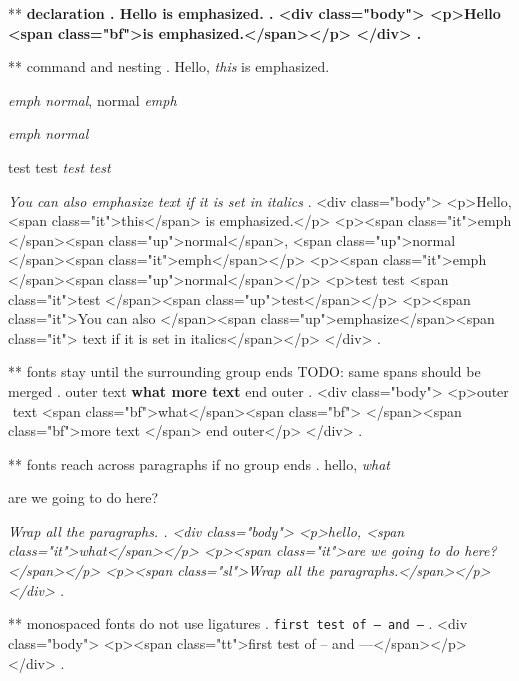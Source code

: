 ** \bfseries declaration
.
Hello \bfseries is emphasized.
.
<div class="body">
<p>Hello <span class="bf">is emphasized.</span></p>
</div>
.

** \emph{} command and nesting
.
Hello, \emph{this} is emphasized.

\emph{emph \textup{normal}}, \textup{normal \emph{emph}}

\emph{emph \emph{normal}}

test {test \em\em\em test \em test}

\textit{You can also \emph{emphasize} text if it is set in italics}
.
<div class="body">
<p>Hello, <span class="it">this</span> is emphasized.</p>
<p><span class="it">emph </span><span class="up">normal</span>, <span class="up">normal </span><span class="it">emph</span></p>
<p><span class="it">emph </span><span class="up">normal</span></p>
<p>test test <span class="it">test </span><span class="up">test</span></p>
<p><span class="it">You can also </span><span class="up">emphasize</span><span class="it"> text if it is set in italics</span></p>
</div>
.


** fonts stay until the surrounding group ends      TODO: same spans should be merged
.
outer { text \bfseries {what} more text } end outer
.
<div class="body">
<p>outer ​ text <span class="bf">what</span><span class="bf">​ </span><span class="bf">more text </span>​ end outer</p>
</div>
.


** fonts reach across paragraphs if no group ends
.
hello, \itshape what

are we going to do here?

\slshape
Wrap all the paragraphs.
.
<div class="body">
<p>hello, <span class="it">what</span></p>
<p><span class="it">are we going to do here?</span></p>
<p><span class="sl">Wrap all the paragraphs.</span></p>
</div>
.


** monospaced fonts do not use ligatures
.
\texttt{first test of -- and ---}
.
<div class="body">
<p><span class="tt">first test of -- and ---</span></p>
</div>
.
